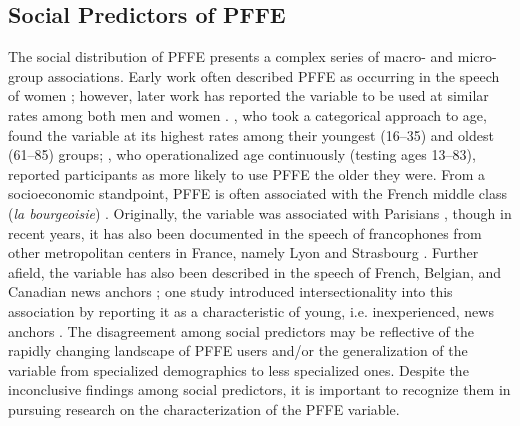 \documentclass[output=paper,colorlinks,citecolor=brown,draftmode]{langscibook}
\begin{document}
\subsection{Social Predictors of PFFE}
The social distribution of PFFE presents a complex series of macro- and micro-group associations. Early work often described PFFE as occurring in the speech of women \citep{fonagy1989franccais, fagyal1999sound, smith2006and}; however, later work has reported the variable to be used at similar rates among both men and women \citep{candea2012journal, candea2013recent, dalola2014drole}.
\citet{fagyal1999sound}, who took a categorical approach to age, found the variable at its highest rates among their youngest (16--35) and oldest (61--85) groups; \citet{dalola2014drole}, who operationalized age continuously (testing ages 13--83), reported participants as more likely to use PFFE the older they were. From a socioeconomic standpoint, PFFE is often associated with the French middle class (\emph{la bourgeoisie}) \citep{paternostro2008devoisement,fagyal2010accents}. Originally, the variable was associated with Parisians \citep{fagyal1999sound, smith2006and, fagyal2010accents}, though in recent years, it has also been documented in the speech of francophones from other metropolitan centers in France, namely Lyon and Strasbourg \citep{dalola2014drole}. Further afield, the variable has also been described in the speech of French, Belgian, and Canadian news anchors \citep{paternostro2008devoisement,candea2013recent}; one study introduced intersectionality into this association by reporting it as a characteristic of young, i.e. inexperienced, news anchors \citep{candea2012journal}. The disagreement among social predictors may be reflective of the rapidly changing landscape of PFFE users and/or the generalization of the variable from specialized demographics to less specialized ones. Despite the inconclusive findings among social predictors, it is important to recognize them in pursuing research on the characterization of the PFFE variable.
\end{document}
